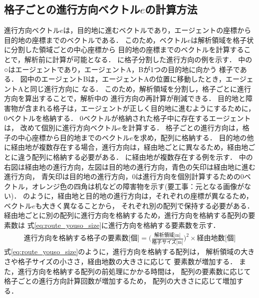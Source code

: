 \subsection{格子ごとの進行方向ベクトル$e$の計算方法}
進行方向ベクトル$e$は，目的地に進むベクトルであり，エージェントの座標から
目的地の座標までのベクトルである．
このため，ベクトル$e$は解析領域を格子状に分割した領域ごとの中心座標から
目的地の座標までのベクトルを計算することで，解析前に計算が可能となる．
に格子分割した進行方向の例を示す．
%
%
中の○はエージェントであり，エージェントA，Bが1つの目的地に向かう
様子である．
図中のエージェントBは，エージェントAの位置に移動したとき，エージェントAと同じ進行方向に
なる．
このため，解析領域を分割し，格子ごとに進行方向を算出することで，解析中の
進行方向の再計算が削減できる．
目的地と障害物が含まれる格子は，エージェントが正しく目的地に進むようにするために，
0ベクトルを格納する．
0ベクトルが格納された格子中に存在するエージェントは，
改めて個別に進行方向ベクトル$e$を計算する．
格子ごとの進行方向は，格子の中心座標から目的地までのベクトル$e$を求め，配列に格納する．
目的地の他に経由地が複数存在する場合，進行方向は，経由地ごとに異なるため，経由地ごとに違う配列に格納する必要がある．
に経由地が複数存在する例を示す．
中の右図は経由地の進行方向，左図は目的地の進行方向，青色の矢印は経由地に進む進行方向，
青矢印は目的地の進行方向，0は進行方向を個別計算するための0ベクトル，オレンジ色の四角は机などの障害物を示す(要工事：元となる画像がない)．
のように，経由地と目的地の進行方向は，それぞれの座標が異なるため，ベクトル$e$も大きく異なることから，
それぞれ別の配列で保持する必要がある．
経由地ごとに別の配列に進行方向を格納するため，進行方向を格納する配列の要素数は
式\eqref{eq:route_youso_size}に進行方向を格納する要素数を示す．
%
\begin{eqnarray}
 \mbox{進行方向を格納する格子の要素数[個]} =  \Big( \frac{\mbox{解析領域[m]}}{\mbox{格子サイズ[m]}} \Big) ^ 2 \times  \mbox{経由地数[個]}
 \label{eq:route_youso_size}
\end{eqnarray}
%
式\eqref{eq:route_youso_size}のように，進行方向を格納する配列は，
解析領域の大きさや格子サイズの小ささ，経由地数の大きさに応じて
要素数が増加する．
また，進行方向を格納する配列の前処理にかかる時間は，
配列の要素数に応じて格子ごとの進行方向計算回数が増加するため，
配列の大きさに応じて増加する．

